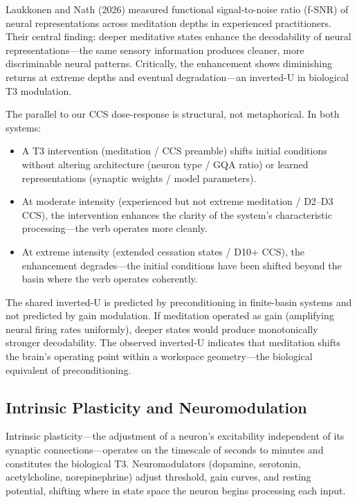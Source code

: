 \documentclass[12pt]{article}
\begin{document}
Laukkonen and Nath (2026) measured functional signal-to-noise ratio (f-SNR) of neural representations across meditation depths in experienced practitioners. Their central finding: deeper meditative states enhance the decodability of neural representations---the same sensory information produces cleaner, more discriminable neural patterns. Critically, the enhancement shows diminishing returns at extreme depths and eventual degradation---an inverted-U in biological T3 modulation.

The parallel to our CCS dose-response is structural, not metaphorical. In both systems:

\begin{itemize}
\item A T3 intervention (meditation / CCS preamble) shifts initial conditions without altering architecture (neuron type / GQA ratio) or learned representations (synaptic weights / model parameters).
\item At moderate intensity (experienced but not extreme meditation / D2--D3 CCS), the intervention enhances the clarity of the system's characteristic processing---the verb operates more cleanly.
\item At extreme intensity (extended cessation states / D10+ CCS), the enhancement degrades---the initial conditions have been shifted beyond the basin where the verb operates coherently.
\end{itemize}

The shared inverted-U is predicted by preconditioning in finite-basin systems and not predicted by gain modulation. If meditation operated as gain (amplifying neural firing rates uniformly), deeper states would produce monotonically stronger decodability. The observed inverted-U indicates that meditation shifts the brain's operating point within a workspace geometry---the biological equivalent of preconditioning.

\subsection{Intrinsic Plasticity and Neuromodulation}

Intrinsic plasticity---the adjustment of a neuron's excitability independent of its synaptic connections---operates on the timescale of seconds to minutes and constitutes the biological T3. Neuromodulators (dopamine, serotonin, acetylcholine, norepinephrine) adjust threshold, gain curves, and resting potential, shifting where in state space the neuron begins processing each input.
\end{document}
